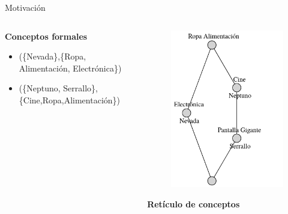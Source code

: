 \documentclass{beamer}
\begin{document}
\begin{frame}{Motivación}
\begin{columns}
\begin{column}{0.6\textwidth}
\begin{center}
        \vspace{15mm}
        \pause
        \textbf{Conceptos formales}
        \begin{itemize}
            \item \tiny(\{Nevada\},\{Ropa, Alimentación, Electrónica\})
            \item \tiny(\{Neptuno, Serrallo\},\{Cine,Ropa,Alimentación\})
        \end{itemize}
        \end{center}
      \end{column}
       \hspace{3mm}
       \pause
      \begin{column}{0.4\textwidth}  %
        \begin{center}
            \begin{figure}[H]
            \includegraphics[scale=0.38]{images/grafo-comerciales.png}
            \end{figure}
            \textbf{Retículo de conceptos}
        \end{center}
      \end{column}
    \end{columns}
\end{frame}
  
\end{document}

